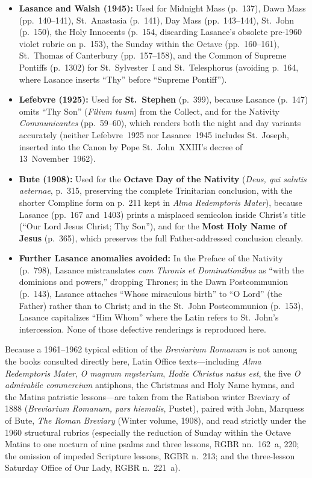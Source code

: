 \begin{itemize}
\item \textbf{Lasance and Walsh (1945):} Used for Midnight Mass (p.~137), Dawn
Mass (pp.~140--141), St.~Anastasia (p.~141), Day Mass (pp.~143--144), St.~John
(p.~150), the Holy Innocents (p.~154, discarding Lasance's obsolete pre-1960
violet rubric on p.~153), the Sunday within the Octave (pp.~160--161),
St.~Thomas of Canterbury (pp.~157--158), and the Common of Supreme Pontiffs
(p.~1302) for St.~Sylvester~I and St.~Telesphorus (avoiding p.~164, where
Lasance inserts ``Thy'' before ``Supreme Pontiff'').
\item \textbf{Lefebvre (1925):} Used for \textbf{St.~Stephen} (p.~399), because
Lasance (p.~147) omits ``Thy Son'' (\textit{Filium tuum}) from the Collect, and
for the Nativity \textit{Communicantes} (pp.~59--60), which renders both the
night and day variants accurately (neither Lefebvre~1925 nor Lasance~1945
includes St.~Joseph, inserted into the Canon by Pope St.~John~XXIII's decree of
13~November~1962).
\item \textbf{Bute (1908):} Used for the \textbf{Octave Day of the Nativity}
(\textit{Deus, qui salutis aeternae}, p.~315, preserving the complete
Trinitarian conclusion, with the shorter Compline form on p.~211 kept in
\textit{Alma Redemptoris Mater}), because Lasance (pp.~167 and~1403) prints a
misplaced semicolon inside Christ's title (``Our Lord Jesus Christ; Thy Son''),
and for the \textbf{Most Holy Name of Jesus} (p.~365), which preserves the full
Father-addressed conclusion cleanly.
\item \textbf{Further Lasance anomalies avoided:} In the Preface of the Nativity
(p.~798), Lasance mistranslates \textit{cum Thronis et Dominationibus} as ``with
the dominions and powers,'' dropping Thrones; in the Dawn Postcommunion (p.~143),
Lasance attaches ``Whose miraculous birth'' to ``O Lord'' (the Father) rather
than to Christ; and in the St.~John Postcommunion (p.~153), Lasance capitalizes
``Him Whom'' where the Latin refers to St.~John's intercession. None of those
defective renderings is reproduced here.
\end{itemize}

Because a 1961--1962 typical edition of the \textit{Breviarium Romanum} is not
among the books consulted directly here, Latin Office texts---including
\textit{Alma Redemptoris Mater}, \textit{O magnum mysterium}, \textit{Hodie
Christus natus est}, the five \textit{O admirabile commercium} antiphons, the
Christmas and Holy Name hymns, and the Matins patristic lessons---are taken from
the Ratisbon winter Breviary of 1888 (\textit{Breviarium Romanum, pars
hiemalis}, Pustet), paired with John, Marquess of Bute, \textit{The Roman
Breviary} (Winter volume, 1908), and read strictly under the 1960 structural
rubrics (especially the reduction of Sunday within the Octave Matins to one
nocturn of nine psalms and three lessons, RGBR nn.~162~a, 220; the omission of
impeded Scripture lessons, RGBR n.~213; and the three-lesson Saturday Office of
Our Lady, RGBR n.~221~a).

